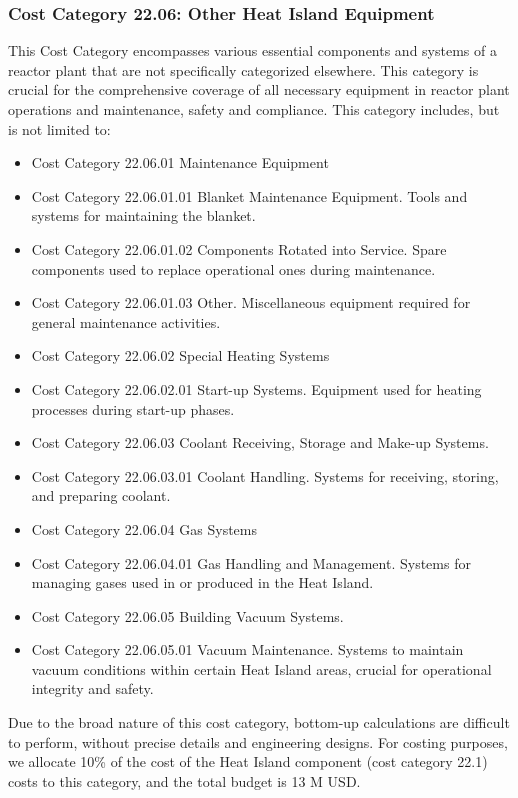 \subsubsection{Cost Category 22.06: Other Heat Island Equipment}

This Cost Category encompasses various essential components and systems of a reactor plant that are not specifically categorized elsewhere. This category is crucial for the comprehensive coverage of all necessary equipment in reactor plant operations and maintenance, safety and compliance.  This category includes, but is not limited to:


\begin{itemize}
    \item Cost Category 22.06.01 Maintenance Equipment
    \item Cost Category 22.06.01.01 Blanket Maintenance Equipment. Tools and systems for maintaining the blanket.
    \item Cost Category 22.06.01.02 Components Rotated into Service. Spare components used to replace operational ones during maintenance.
    \item Cost Category 22.06.01.03 Other. Miscellaneous equipment required for general maintenance activities.
    \item Cost Category 22.06.02 Special Heating Systems
    \item Cost Category 22.06.02.01 Start-up Systems. Equipment used for heating processes during start-up phases.
    \item Cost Category 22.06.03 Coolant Receiving, Storage and Make-up Systems.
    \item Cost Category 22.06.03.01 Coolant Handling. Systems for receiving, storing, and preparing coolant.
    \item Cost Category 22.06.04 Gas Systems
    \item Cost Category 22.06.04.01 Gas Handling and Management. Systems for managing gases used in or produced in the Heat Island.
    \item Cost Category 22.06.05 Building Vacuum Systems.
    \item Cost Category 22.06.05.01 Vacuum Maintenance. Systems to maintain vacuum conditions within certain Heat Island areas, crucial for operational integrity and safety.
\end{itemize}

Due to the broad nature of this cost category, bottom-up calculations are difficult to perform, without precise details and engineering designs. For costing purposes, we allocate 10\% of the cost of the Heat Island component (cost category 22.1) costs to this category, and the total budget is 13 M USD.